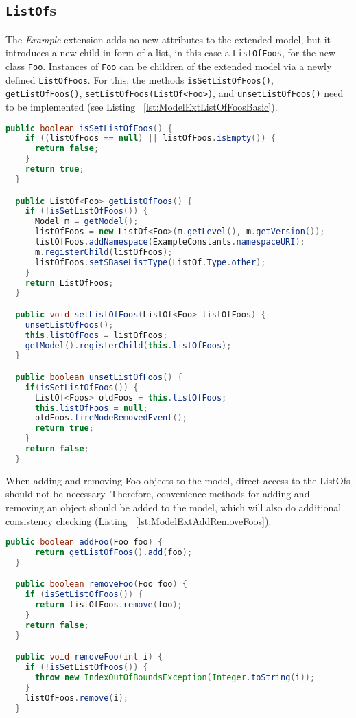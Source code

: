 \subsection{\texttt{ListOf}s}

The \emph{Example} extension adds no new attributes to the extended model,
but it introduces a new child in form of a list, in this case a \texttt{ListOfFoos},
for the new class \texttt{Foo}.
Instances of \texttt{Foo} can be children of the extended model via a newly defined \texttt{ListOfFoos}.
For this, the methods \texttt{isSetListOfFoos()}, \texttt{getListOfFoos()}, \texttt{setListOfFoos(ListOf<Foo>)}, and \texttt{unsetListOfFoos()} need to be implemented (see Listing ~\vref{lst:ModelExtListOfFoosBasic}).

\begin{lstlisting}[language=Java,caption={Implementation of ListOf the methods: \texttt{isSetListOfFoos()}, \texttt{getListOfFoos()}, \texttt{setListOfFoos()}},label={lst:ModelExtListOfFoosBasic}]
public boolean isSetListOfFoos() {
    if ((listOfFoos == null) || listOfFoos.isEmpty()) {
      return false;
    }
    return true;
  }

  public ListOf<Foo> getListOfFoos() {
    if (!isSetListOfFoos()) {
      Model m = getModel();
      listOfFoos = new ListOf<Foo>(m.getLevel(), m.getVersion());
      listOfFoos.addNamespace(ExampleConstants.namespaceURI);
      m.registerChild(listOfFoos);
      listOfFoos.setSBaseListType(ListOf.Type.other);
    }
    return ListOfFoos;
  }

  public void setListOfFoos(ListOf<Foo> listOfFoos) {
    unsetListOfFoos();
    this.listOfFoos = listOfFoos;
    getModel().registerChild(this.listOfFoos);
  }

  public boolean unsetListOfFoos() {
    if(isSetListOfFoos()) {
      ListOf<Foos> oldFoos = this.listOfFoos;
      this.listOfFoos = null;
      oldFoos.fireNodeRemovedEvent();
      return true;
    }
    return false;
  }
\end{lstlisting}

When adding and removing Foo objects to the model, direct access to the ListOfs should not be necessary.
Therefore, convenience methods for adding and removing an object should be added to the model, which will also do additional consistency checking (Listing ~\vref{lst:ModelExtAddRemoveFoos}).

\begin{lstlisting}[language=Java,caption={Implementaion of ListOf methods \texttt{addFoo(Foo foo)}, \texttt{removeFoo(Foo foo)}, \texttt{removeFoo(int i)}},label={lst:ModelExtAddRemoveFoos}]
  public boolean addFoo(Foo foo) {
      return getListOfFoos().add(foo);
  }

  public boolean removeFoo(Foo foo) {
    if (isSetListOfFoos()) {
      return listOfFoos.remove(foo);
    }
    return false;
  }

  public void removeFoo(int i) {
    if (!isSetListOfFoos()) {
      throw new IndexOutOfBoundsException(Integer.toString(i));
    }
    listOfFoos.remove(i);
  }
\end{lstlisting}

